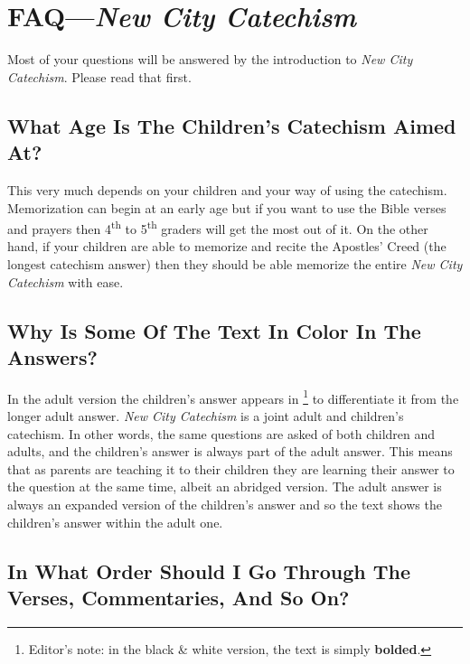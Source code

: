 \documentclass[00-main.tex]{subfiles}
\begin{document}
\chapter{FAQ---{\em New City Catechism}}

Most of your questions will be answered by the introduction to \emph{New City Catechism}. Please read that first.

\section[What Age Is The Children's Catechism Aimed At?][Catechism For What Age Children?]{What Age Is The Children's Catechism Aimed At?}

This very much depends on your children and your way of using the catechism. Memorization can begin at an early age but if you want to use the Bible verses and prayers then 4\textsuperscript{th} to 5\textsuperscript{th} graders will get the most out of it. On the other hand, if your children are able to memorize and recite the Apostles' Creed (the longest catechism answer) then they should be able memorize the entire \emph{New City Catechism}\/ with ease.

\section[Why Is Some Of The Text In Color In The Answers?][Why Is Some Text In Color?]{Why Is Some Of The Text In Color In The Answers?}

In the adult version the children's answer appears in \footnote{Editor's note: in the black \& white version, the text is simply \textbf{bolded}.} to differentiate it from the longer adult answer. \emph{New City Catechism}\/ is a joint adult and children's catechism. In other words, the same questions are asked of both children and adults, and the children's answer is always part of the adult answer. This means that as parents are teaching it to their children they are learning their answer to the question at the same time, albeit an abridged version. The adult answer is always an expanded version of the children's answer and so the  text shows the children's answer within the adult one.

\section[In What Order Should I Go Through The Verses, Commentaries, And So On?][Additional Resources]{In What Order Should I Go Through The Verses, Commentaries, And So On?}
\end{document}
